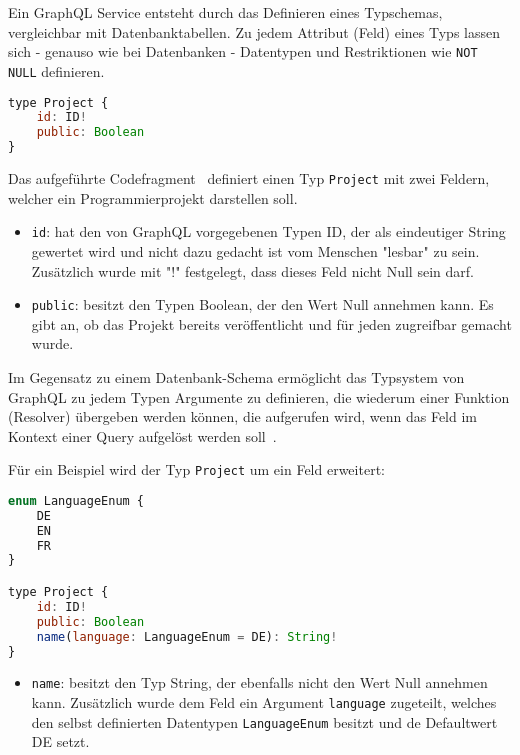 Ein GraphQL Service entsteht durch das Definieren eines Typschemas, vergleichbar mit Datenbanktabellen. Zu jedem Attribut (Feld) eines Typs lassen sich - genauso wie bei Da\-tenban\-ken -
Datentypen und Restriktionen wie \texttt{NOT NULL} definieren.

\begin{lstlisting}[language=Javascript,float=h!,caption={Project Typdefinition}, label={fig:basics:graphql:1}]
type Project {
    id: ID!
    public: Boolean
}
\end{lstlisting}

Das aufgeführte Codefragment~ definiert einen Typ \texttt{Project} mit zwei Feldern, welcher ein Programmierprojekt darstellen soll.

\begin{itemize}
	\setlength\itemsep{-1em}
    \item \texttt{id}: hat den von GraphQL vorgegebenen Typen ID, der als eindeutiger String gewertet wird und nicht dazu gedacht ist vom Menschen "lesbar" zu sein.
    Zusätzlich wurde mit "!" festgelegt, dass dieses Feld nicht Null sein darf.
    \item \texttt{public}: besitzt den Typen Boolean, der den Wert Null annehmen kann.
    Es gibt an, ob das Projekt bereits veröffentlicht und für jeden zugreifbar gemacht wurde.
\end{itemize}

Im Gegensatz zu einem Datenbank-Schema ermöglicht das Typsystem von GraphQL zu jedem Typen Argumente zu definieren,
die wiederum einer Funktion (Resolver) übergeben werden können,
die aufgerufen wird, wenn das Feld im Kontext einer Query aufgelöst werden soll~\cite{graphql-resolver}.

Für ein Beispiel wird der Typ \texttt{Project} um ein Feld erweitert:

\begin{lstlisting}[language=Javascript,float=h!,caption={Erweiterung der Typdefinition von Project und Einführung eines Enums mit Ländercodes}, label={fig:basics:graphql:2}]
enum LanguageEnum {
    DE
    EN
    FR
}

type Project {
    id: ID!
    public: Boolean
    name(language: LanguageEnum = DE): String!
}
\end{lstlisting}

\begin{itemize}
	\setlength\itemsep{-1em}
    \item \texttt{name}: besitzt den Typ String, der ebenfalls nicht den Wert Null annehmen kann. Zusätzlich wurde dem Feld ein Argument \texttt{language} zugeteilt,
    welches den selbst definierten Datentypen \texttt{LanguageEnum} besitzt und de Defaultwert DE setzt.
\end{itemize}

